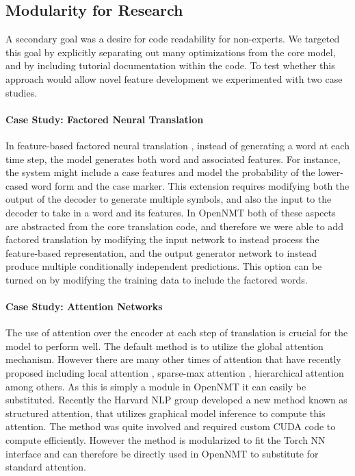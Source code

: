 \documentclass[11pt]{article}
\begin{document}
\subsection{Modularity for Research}

A secondary goal was a desire for code readability for non-experts.
We targeted this goal by explicitly separating out many optimizations
from the core model, and by including tutorial documentation within
the code. To test whether this approach would allow novel feature
development we experimented with two case studies.

\paragraph{Case Study: Factored Neural Translation}

In feature-based factored neural translation
\cite{sennrich2016linguistic}, instead of  generating a word at
each time step, the model generates both word and associated features. For
instance,  the system might include a case features and
model the probability of the lower-cased word form and the
case marker. This extension requires modifying both the output of the
decoder to generate multiple symbols, and also the input to the
decoder to take in a word and its features. In OpenNMT both of these
aspects are abstracted from the core translation code, and therefore
we were able to add factored translation by modifying the input
network to instead process the feature-based representation, and the
output generator network to instead produce multiple conditionally
independent predictions.  This option can be turned on by modifying
the training data to include the factored words.

\paragraph{Case Study: Attention Networks}

The use of attention over the encoder at each step of translation is
crucial for the model to perform well. The default method is to
utilize the global attention mechanism. However
there are many other times of attention that have recently proposed
including local attention \cite{Luong2015}, sparse-max attention
\cite{martins2016softmax}, hierarchical attention
\cite{yang2016hierarchical} among others. As this is simply a module
in OpenNMT it can easily be substituted. Recently the Harvard NLP
group developed a new method known as structured attention,
that utilizes graphical model inference to compute this attention. The
method was quite involved and required custom CUDA code to compute
efficiently. However the method is modularized to fit the Torch NN
interface and can therefore be directly used in OpenNMT to substitute
for standard attention.
\end{document}
